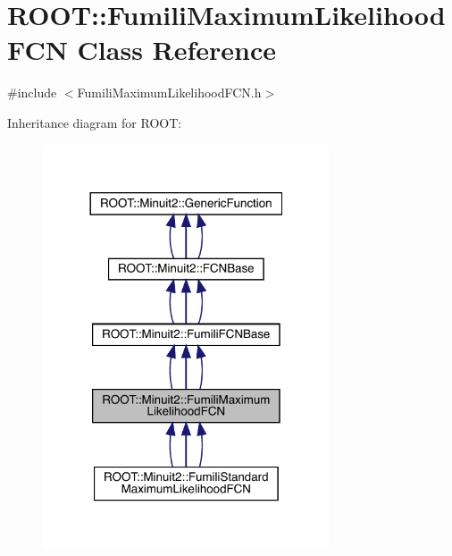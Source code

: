 \hypertarget{classROOT_1_1Minuit2_1_1FumiliMaximumLikelihoodFCN}{}\section{R\+O\+OT\+:\+:Fumili\+Maximum\+Likelihood\+F\+CN Class Reference}
\label{classROOT_1_1Minuit2_1_1FumiliMaximumLikelihoodFCN}


{\ttfamily \#include $<$Fumili\+Maximum\+Likelihood\+F\+C\+N.\+h$>$}



Inheritance diagram for R\+O\+OT\+:
\nopagebreak
\begin{figure}[H]
\begin{center}
\leavevmode
\includegraphics[width=240pt]{d6/d0b/classROOT_1_1Minuit2_1_1FumiliMaximumLikelihoodFCN__inherit__graph}
\end{center}
\end{figure}


